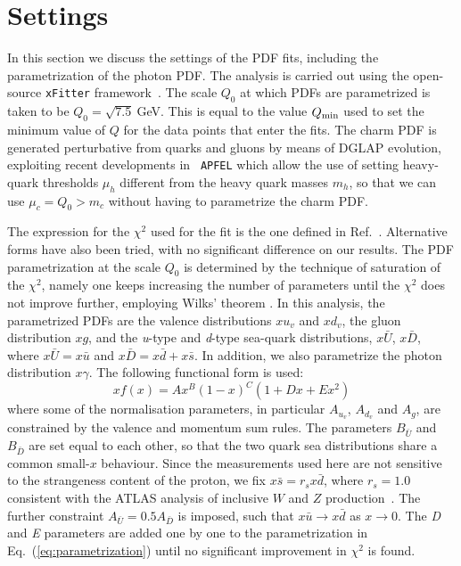 \section{Settings}
\label{sec:fitsettings}

In this section we discuss the settings of the PDF fits, including the
parametrization of the photon PDF.
%
The analysis is carried out using the open-source {\tt xFitter}
framework~\cite{Alekhin:2014irh}.
%
The scale $Q_0$ at which PDFs are parametrized is taken to be
$Q_0 = \sqrt{7.5}~$GeV.
%
This is equal to the value $Q_{\rm min}$ used to set the minimum value
of $Q$ for the data points that enter the fits.
%
The charm PDF is generated perturbative from quarks and gluons by
means of DGLAP evolution, exploiting recent developments in {\tt
  APFEL} which allow the use of setting heavy-quark thresholds $\mu_h$
different from the heavy quark masses $m_h$, so that we can use
$\mu_c=Q_0 > m_c$ without having to parametrize the charm PDF.

The expression for the $\chi^2$ used for the fit is the one defined in
Ref.~\cite{Aaron:2009aa}.
%
Alternative forms have also been tried, with no significant difference
on our results.
% 
The PDF parametrization at the scale $Q_0$ is determined by the
technique of saturation of the $\chi^{2}$, namely one keeps increasing
the number of parameters until the $\chi^{2}$ does not improve
further, employing Wilks' theorem \cite{Wilks:1938dza}.
%
In this analysis, the parametrized PDFs are the valence distributions
$xu_{v}$ and $xd_{v}$, the gluon distribution $xg$, and the
\textit{u}-type and \textit{d}-type sea-quark distributions,
$x\bar{U}$, $x\bar{D}$, where $x\bar{U} = x\bar{u}$ and
$x\bar{D} = x\bar{d} + x\bar{s}$.
%
In addition, we also parametrize the photon distribution $x\gamma$.
%
The following functional form is used:
\begin{equation}
  \label{eq:parametrization}
xf(x) = Ax^{B}(1-x)^{C}(1+Dx+Ex^{2})
\end{equation}
where some of the normalisation parameters, in particular $A_{u_{v}}$,
$A_{d_{v}}$ and $A_{g}$, are constrained by the valence and momentum
sum rules.
%
The parameters $B_{\bar{U}}$ and $B_{\bar{D}}$ are set equal to each
other, so that the two quark sea distributions share a common
small-$x$ behaviour.
%
Since the measurements used here are not sensitive to the strangeness
content of the proton, we fix $x\bar{s} = r_sx\bar{d}$, where
$r_s=1.0$ consistent with the ATLAS analysis of inclusive $W$
and $Z$ production~\cite{Aad:2012sb,Aaboud:2016btc}.
%
The further constraint $A_{\bar{U}} = 0.5 A_{\bar{D}}$ is imposed,
such that $x\bar{u} \to x\bar{d}$ as $x \to 0$.  The \textit{D} and
\textit{E} parameters are added one by one to the parametrization in
Eq.~(\ref{eq:parametrization}) until no significant improvement in
$\chi^{2}$ is found.

